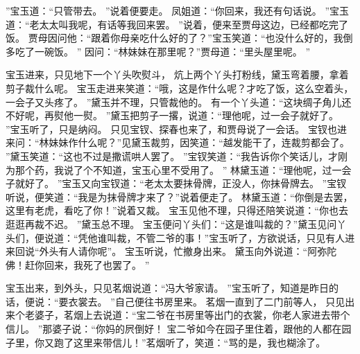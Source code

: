 ”宝玉道：“只管带去。
”说着便要走。
凤姐道：“你回来，我还有句话说。
”宝玉道：“老太太叫我呢，有话等我回来罢。
”说着，便来至贾母这边，已经都吃完了饭。
贾母因问他：“跟着你母亲吃什么好的了？”宝玉笑道：“也没什么好的，我倒多吃了一碗饭。
”
因问：“林妹妹在那里呢？”贾母道：“里头屋里呢。
”\par
宝玉进来，只见地下一个丫头吹熨斗，
炕上两个丫头打粉线，黛玉弯着腰，拿着剪子裁什么呢。
宝玉走进来笑道：“哦，这是作什么呢？才吃了饭，这么空着头，一会子又头疼了。
”黛玉并不理，只管裁他的。
有一个丫头道：“这块绸子角儿还不好呢，再熨他一熨。
”黛玉把剪子一撂，说道：“理他呢，过一会子就好了。
”宝玉听了，只是纳闷。
只见宝钗、探春也来了，和贾母说了一会话。
宝钗也进来问：“林妹妹作什么呢？”见黛玉裁剪，因笑道：“越发能干了，连裁剪都会了。
”黛玉笑道：“这也不过是撒谎哄人罢了。
”宝钗笑道：“我告诉你个笑话儿，才刚为那个药，我说了个不知道，宝玉心里不受用了。
”
林黛玉道：“理他呢，过一会子就好了。
”宝玉又向宝钗道：“老太太要抹骨牌，正没人，你抹骨牌去。
”宝钗听说，便笑道：“我是为抹骨牌才来了？”说着便走了。
林黛玉道：“你倒是去罢，这里有老虎，看吃了你！”说着又裁。
宝玉见他不理，只得还陪笑说道：“你也去逛逛再裁不迟。
”黛玉总不理。
宝玉便问丫头们：“这是谁叫裁的？”黛玉见问丫头们，便说道：“凭他谁叫裁，不管二爷的事！”宝玉听了，方欲说话，只见有人进来回说“外头有人请你呢”。
宝玉听说，忙撤身出来。
黛玉向外说道：“阿弥陀佛！赶你回来，我死了也罢了。
”\par
宝玉出来，到外头，只见茗烟说道：“冯大爷家请。
”宝玉听了，知道是昨日的话，便说：“要衣裳去。
”自己便往书房里来。
茗烟一直到了二门前等人，
只见出来个老婆子，茗烟上去说道：“宝二爷在书房里等出门的衣裳，你老人家进去带个信儿。
”那婆子说：“你妈的屄倒好！
宝二爷如今在园子里住着，跟他的人都在园子里，你又跑了这里来带信儿！”茗烟听了，笑道：“骂的是，我也糊涂了。
